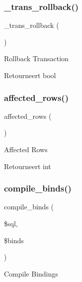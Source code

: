 \subsubsection{\texorpdfstring{\_trans\_rollback()}{\_trans\_rollback()}}
{\footnotesize\ttfamily \+\_\+trans\+\_\+rollback (\begin{DoxyParamCaption}{ }\end{DoxyParamCaption})\hspace{0.3cm}{\ttfamily [protected]}}

Rollback Transaction

\begin{DoxyReturn}{Retourneert}
bool 
\end{DoxyReturn}
\mbox{\label{class_c_i___d_b__odbc__driver_a77248aaad33eb132c04cc4aa3f4bc8cb}} 
\subsubsection{\texorpdfstring{affected\_rows()}{affected\_rows()}}
{\footnotesize\ttfamily affected\+\_\+rows (\begin{DoxyParamCaption}{ }\end{DoxyParamCaption})}

Affected Rows

\begin{DoxyReturn}{Retourneert}
int 
\end{DoxyReturn}
\mbox{\label{class_c_i___d_b__odbc__driver_a0ba381d2e9078472bd0167e75cc8033c}} 
\subsubsection{\texorpdfstring{compile\_binds()}{compile\_binds()}}
{\footnotesize\ttfamily compile\+\_\+binds (\begin{DoxyParamCaption}\item[{}]{\$sql,  }\item[{}]{\$binds }\end{DoxyParamCaption})}

Compile Bindings


